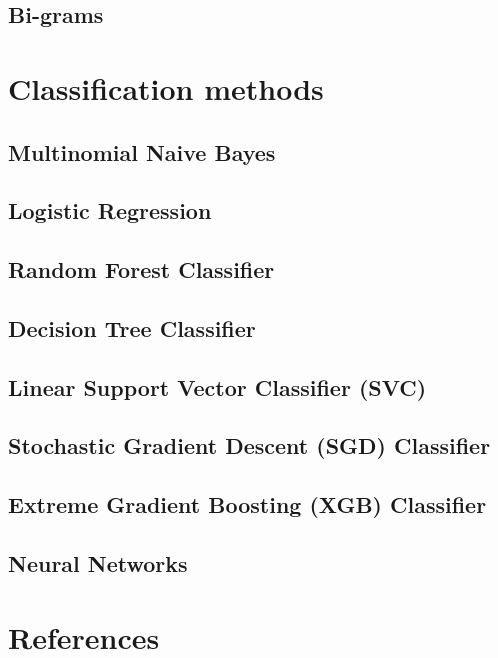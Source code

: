 \documentclass[
]{article}
\begin{document}
\hypertarget{bi-grams}{%
\subsection{Bi-grams}\label{bi-grams}}

\hypertarget{classification-methods}{%
\section{Classification methods}\label{classification-methods}}

\hypertarget{multinomial-naive-bayes}{%
\subsection{Multinomial Naive Bayes}\label{multinomial-naive-bayes}}

\hypertarget{logistic-regression}{%
\subsection{Logistic Regression}\label{logistic-regression}}

\hypertarget{random-forest-classifier}{%
\subsection{Random Forest Classifier}\label{random-forest-classifier}}

\hypertarget{decision-tree-classifier}{%
\subsection{Decision Tree Classifier}\label{decision-tree-classifier}}

\hypertarget{linear-support-vector-classifier-svc}{%
\subsection{Linear Support Vector Classifier
(SVC)}\label{linear-support-vector-classifier-svc}}

\hypertarget{stochastic-gradient-descent-sgd-classifier}{%
\subsection{Stochastic Gradient Descent (SGD)
Classifier}\label{stochastic-gradient-descent-sgd-classifier}}

\hypertarget{extreme-gradient-boosting-xgb-classifier}{%
\subsection{Extreme Gradient Boosting (XGB)
Classifier}\label{extreme-gradient-boosting-xgb-classifier}}

\hypertarget{neural-networks}{%
\subsection{Neural Networks}\label{neural-networks}}

\hypertarget{references}{%
\section{References}\label{references}}
\end{document}
